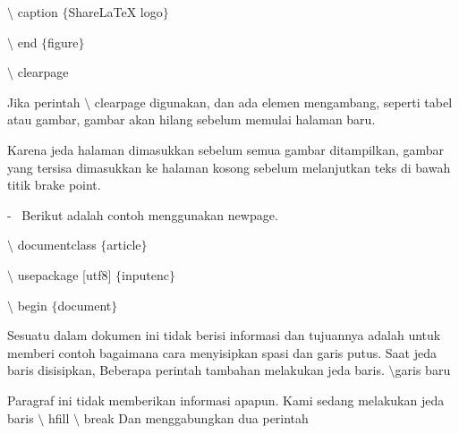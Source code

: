 \begin{itemize}
\hspace*{0.5in}$\setminus$ caption $ \{ $ShareLaTeX logo$ \} $\par

\hspace*{0.5in}$\setminus$ end $ \{ $figure$ \} $\par

\hspace*{0.5in}$\setminus$ clearpage\par

Jika perintah $\setminus$ clearpage digunakan, dan ada elemen mengambang, seperti tabel atau gambar, gambar akan hilang sebelum memulai halaman baru.\par

Karena jeda halaman dimasukkan sebelum semua gambar ditampilkan, gambar yang tersisa dimasukkan ke halaman kosong sebelum melanjutkan teks di bawah titik brake point.\par

\hspace*{0.5in}\hspace*{0.5in}-~ Berikut adalah contoh menggunakan newpage.\par

\hspace*{0.5in}$\setminus$ documentclass $ \{ $article$ \} $\par

\hspace*{0.5in}$\setminus$ usepackage [utf8] $ \{ $inputenc$ \} $ \par

\hspace*{0.5in}$\setminus$ begin $ \{ $document$ \} $\par

\hspace*{0.5in}Sesuatu dalam dokumen ini tidak berisi informasi dan tujuannya adalah untuk memberi \hspace*{0.5in}contoh bagaimana cara menyisipkan spasi dan garis putus. Saat jeda baris disisipkan, \hspace*{0.5in}Beberapa perintah tambahan melakukan jeda baris. $\setminus$garis baru\par

\hspace*{0.5in}Paragraf ini tidak memberikan informasi apapun. Kami sedang melakukan jeda baris $\setminus$ hfill \hspace*{0.5in}$\setminus$ break Dan menggabungkan dua perintah\par


\end{itemize}
